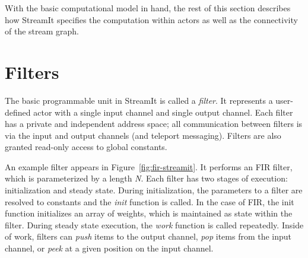 With the basic computational model in hand, the rest of this section
describes how StreamIt specifies the computation within actors as well
as the connectivity of the stream graph.

\section{Filters}
\label{sec:filters}

The basic programmable unit in StreamIt is called a {\it filter}.  It
represents a user-defined actor with a single input channel and single
output channel.  Each filter has a private and independent address
space; all communication between filters is via the input and output
channels (and teleport messaging).  Filters are also granted read-only
access to global constants.

An example filter appears in Figure~\ref{fig:fir-streamit}.  It
performs an FIR filter, which is parameterized by a length {\it N}.
Each filter has two stages of execution: initialization and steady
state.  During initialization, the parameters to a filter are resolved
to constants and the {\it init} function is called.  In the case of
FIR, the init function initializes an array of weights, which is
maintained as state within the filter.  During steady state execution,
the {\it work} function is called repeatedly.  Inside of work, filters
can {\it push} items to the output channel, {\it pop} items from the
input channel, or {\it peek} at a given position on the input channel.

